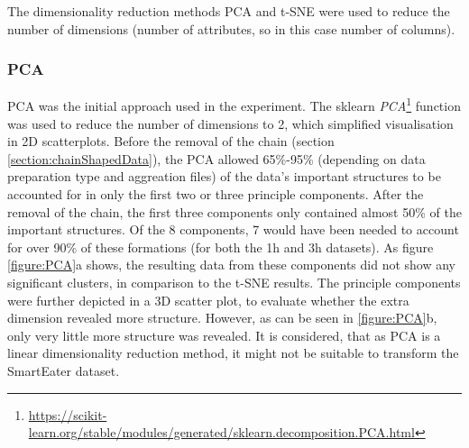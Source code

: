 
The dimensionality reduction methods PCA and t-SNE were used to reduce the number of dimensions (number of attributes, so in this case number of columns). 

\subsubsection{PCA}
PCA was the initial approach used in the experiment. The sklearn \textit{PCA}\footnote{\url{https://scikit-learn.org/stable/modules/generated/sklearn.decomposition.PCA.html}} function was used to reduce the number of dimensions to 2, which simplified visualisation in 2D scatterplots. Before the removal of the chain (section \ref{section:chainShapedData}), the PCA allowed 65\%-95\% (depending on data preparation type and aggreation files) of the data's important structures to be accounted for in only the first two or three principle components. After the removal of the chain, the first three components only contained almost 50\% of the important structures. Of the 8 components, 7 would have been needed to account for over 90\% of these formations (for both the 1h and 3h datasets). As figure \ref{figure:PCA}a shows, the resulting data from these components did not show any significant clusters, in comparison to the t-SNE results. The principle components were further depicted in a 3D scatter plot, to evaluate whether the extra dimension revealed more structure. However, as can be seen in \ref{figure:PCA}b, only very little more structure was revealed. It is considered, that as PCA is a linear dimensionality reduction method, it might not be suitable to transform the SmartEater dataset.


